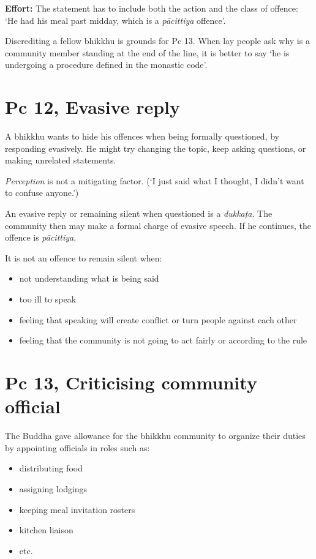 \textbf{Effort:} The statement has to include both the action and the
class of offence: `He had his meal past midday, which is a
\emph{pācittiya} offence'.

Discrediting a fellow bhikkhu is grounds for Pc 13. When lay people ask
why is a community member standing at the end of the line, it is better
to say `he is undergoing a procedure defined in the monastic code'.

\section{Pc 12, Evasive reply}

A bhikkhu wants to hide his offences when being formally questioned, by
responding evasively. He might try changing the topic, keep asking
questions, or making unrelated statements.

\emph{Perception} is not a mitigating factor. (`I just said what I
thought, I didn't want to confuse anyone.')

An evasive reply or remaining silent when questioned is a
\emph{dukkaṭa}. The community then may make a formal charge of evasive
speech. If he continues, the offence is \emph{pācittiya}.

It is not an offence to remain silent when:

\begin{itemize}
\tightlist
\item
  not understanding what is being said
\item
  too ill to speak
\item
  feeling that speaking will create conflict or turn people against each
  other
\item
  feeling that the community is not going to act fairly or according to
  the rule
\end{itemize}

\section{Pc 13, Criticising community official}

The Buddha gave allowance for the bhikkhu community to organize their
duties by appointing officials in roles such as:

\begin{itemize}
\tightlist
\item
  distributing food
\item
  assigning lodgings
\item
  keeping meal invitation rosters
\item
  kitchen liaison
\item
  etc.
\end{itemize}

